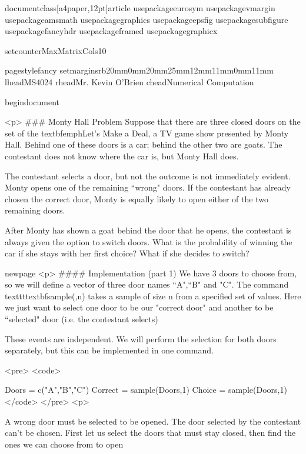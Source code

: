 documentclass[a4paper,12pt]{article}
usepackage{eurosym}
usepackage{vmargin}
usepackage{amsmath}
usepackage{graphics}
usepackage{epsfig}
usepackage{subfigure}
usepackage{fancyhdr}
usepackage{framed}
usepackage{graphicx}

setcounter{MaxMatrixCols}{10}

pagestyle{fancy}
setmarginsrb{20mm}{0mm}{20mm}{25mm}{12mm}{11mm}{0mm}{11mm}
lhead{MS4024} rhead{Mr. Kevin O'Brien}
chead{Numerical Computation}

begin{document}

<p>
### {Monty Hall Problem}
Suppose that there are three closed doors on the set of the  textbf{emph{Let's Make a Deal}}, a TV game show presented by Monty Hall. Behind one of these doors is a car; behind the other two are goats. The contestant does not know where the car is, but Monty Hall does.

The contestant selects a door, but not the outcome is not immediately evident. Monty opens one of the remaining ``wrong" doors. If the contestant has already chosen the correct door, Monty is equally likely to open either of the two remaining doors.

After Monty has shown a goat behind the door that he opens, the contestant is always given the option to switch doors. What is the probability of winning the car if she stays with her first choice? What if she decides to switch?


newpage
<p>
#### {Implementation (part 1)}
We have 3 doors to choose from, so we will define a vector of three door names ``A",``B" and "C". The command texttt{textbf{sample(,n)}} takes a sample of size n from a specified set of values. Here we just want to select one door to be our "correct door" and another to be ``selected" door (i.e. the contestant selects)

These events are independent. We will perform the selection for both doors separately, but this can be implemented in one command.


<pre>
<code>

Doors = c("A","B","C")
Correct = sample(Doors,1)
Choice = sample(Doors,1)
</code> 
</pre>
<p>

A wrong door must be selected to be opened. The door selected by the contestant can't be chosen. First let us select the doors that must stay closed, then find the ones we can choose from to open

